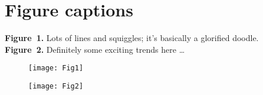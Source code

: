 \documentclass[12pt]{article}
\begin{document}
\section*{Figure captions}
\noindent \textbf{Figure~1.} Lots of lines and squiggles; it's basically a glorified doodle. \\
\noindent \textbf{Figure~2.} Definitely some exciting trends here \ldots
\newpage
\begin{figure}[h!]
  \caption{}
  \label{Fig1}
  \begin{center}
    \texttt{[image: Fig1]}
  \end{center}
\end{figure}
\newpage
\begin{figure}[h!]
  \caption{}
  \label{Fig2}
  \begin{center}
    \texttt{[image: Fig2]}
  \end{center}
\end{figure}
\end{document}
